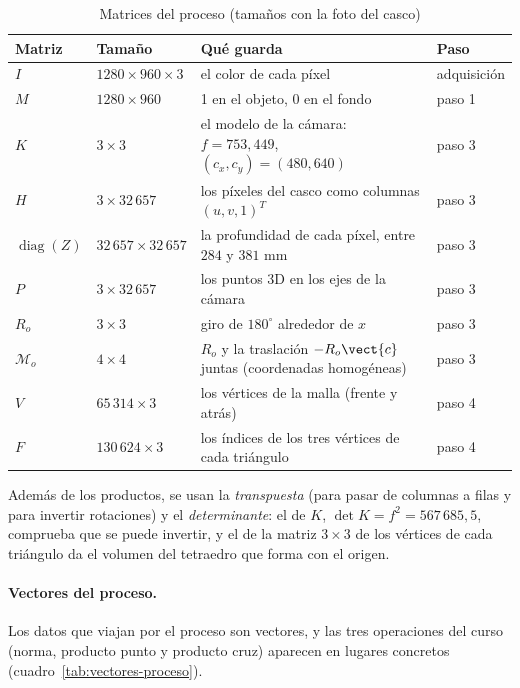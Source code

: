 \begin{table}[htbp]
\caption{Matrices del proceso (tamaños con la foto del casco)}
\label{tab:matrices-proceso}
\centering\small
\begin{tabular}{@{}p{2.3cm}p{3.1cm}p{4.9cm}p{3.2cm}@{}}
\toprule
Matriz & Tamaño & Qué guarda & Paso \\
\midrule
$I$ & $1280\times960\times3$ & el color de cada píxel & adquisición \\
$M$ & $1280\times960$ & 1 en el objeto, 0 en el fondo & paso 1 \\
$K$ & $3\times3$ & el modelo de la cámara: $f=753{,}449$, $(c_x,c_y)=(480,640)$ & paso 3 \\
$H$ & $3\times32\,657$ & los píxeles del casco como columnas $(u,v,1)^{T}$ & paso 3 \\
$\operatorname{diag}(Z)$ & $32\,657\times32\,657$ & la profundidad de cada píxel, entre $284$ y $381$ mm & paso 3 \\
$P$ & $3\times32\,657$ & los puntos 3D en los ejes de la cámara & paso 3 \\
$R_o$ & $3\times3$ & giro de $180^\circ$ alrededor de $x$ & paso 3 \\
$\mathcal{M}_o$ & $4\times4$ & $R_o$ y la traslación $-R_o\vect{c}$ juntas (coordenadas homogéneas) & paso 3 \\
$V$ & $65\,314\times3$ & los vértices de la malla (frente y atrás) & paso 4 \\
$F$ & $130\,624\times3$ & los índices de los tres vértices de cada triángulo & paso 4 \\
\bottomrule
\end{tabular}
\end{table}

Además de los productos, se usan la \emph{transpuesta} (para pasar de columnas a filas y para invertir rotaciones) y el
\emph{determinante}: el de $K$, $\det K=f^2=567\,685{,}5$, comprueba que se puede invertir, y el de la matriz $3\times3$ de los vértices de
cada triángulo da el volumen del tetraedro que forma con el origen.

\paragraph{Vectores del proceso.} Los datos que viajan por el proceso son vectores, y las tres operaciones del curso (norma, producto punto y
producto cruz) aparecen en lugares concretos (cuadro~\ref{tab:vectores-proceso}).

